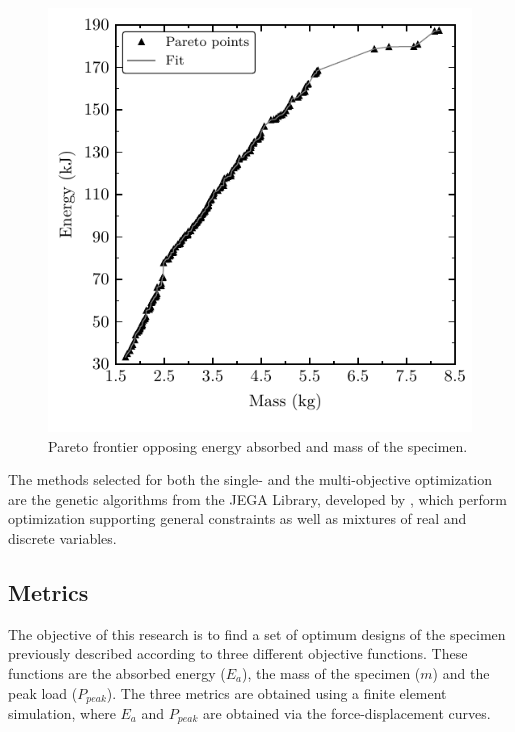 \documentclass[cmfonts]{witpress}
\begin{document}
\begin{figure}[htpb]
  \centering
   \includegraphics[width=.8\columnwidth]{figures/IMG/Pareto}
  \caption{Pareto frontier opposing energy absorbed and mass of the specimen.}
  \label{fig:Pareto}
\end{figure}


The methods selected for both the single- and the multi-objective optimization are the genetic algorithms from the JEGA Library, developed by \cite{JEGA}, which perform optimization supporting general constraints as well as mixtures of real and discrete variables.

\subsection{Metrics}

The objective of this research is to find a set of optimum designs of the specimen previously described according to three different objective functions. These functions are the absorbed energy ($E_a$), the mass of the specimen ($m$) and the peak load ($P_{peak}$). The three metrics are obtained using a finite element simulation, where $E_a$ and $P_{peak}$ are obtained via the force-displacement curves.
\end{document}

